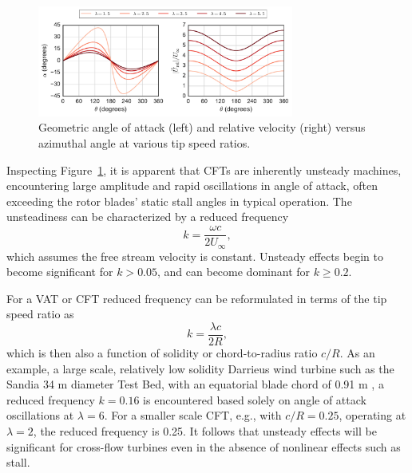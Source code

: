 \documentclass[times]{weauth}
\begin{document}
\begin{figure}
    \centering

    \includegraphics[width=0.75\textwidth]{CFT-vectors_alpha_deg_urel_geom}

    \caption{Geometric angle of attack (left) and relative velocity (right)
        versus azimuthal angle at various tip speed ratios.}

    \label{fig:geom-alpha-urel}
\end{figure}

Inspecting Figure~\ref{fig:geom-alpha-urel}, it is apparent that CFTs are
inherently unsteady machines, encountering large amplitude and rapid
oscillations in angle of attack, often exceeding the rotor blades' static stall
angles in typical operation. The unsteadiness can be characterized by a reduced
frequency~\cite{Leishman2006}
\begin{equation}
    k = \frac{\omega c}{2 U_\infty},
\end{equation}
which assumes the free stream velocity is constant. Unsteady effects begin to
become significant for $k > 0.05$, and can become dominant for $k \ge 0.2$.

For a VAT or CFT reduced frequency can be reformulated in terms of the tip speed
ratio as
\begin{equation}
    k = \frac{\lambda c}{2R},
\end{equation}
which is then also a function of solidity or chord-to-radius ratio $c/R$. As an
example, a large scale, relatively low solidity Darrieus wind turbine such as
the Sandia 34 m diameter Test Bed, with an equatorial blade chord of 0.91 m
\cite{Murray2011}, a reduced frequency $k=0.16$ is encountered based solely on
angle of attack oscillations at $\lambda=6$. For a smaller scale CFT, e.g., with
$c/R = 0.25$, operating at $\lambda = 2$, the reduced frequency is 0.25. It
follows that unsteady effects will be significant for cross-flow turbines even
in the absence of nonlinear effects such as stall.
\end{document}

